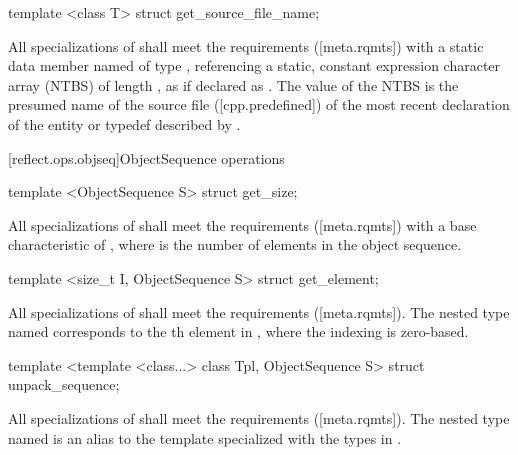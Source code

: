 \begin{std.txt}
\begin{itemdescr}
\end{itemdescr}

\begin{itemdecl}
template <class T> struct get_source_file_name;
\end{itemdecl}

\begin{itemdescr}
\pnum
All specializations of  shall meet the  requirements ([meta.rqmts]) with a static data member named  of type , referencing a static, constant expression character array (NTBS) of length , as if declared as . The value of the NTBS is the presumed name of the source file ([cpp.predefined]) of the most recent declaration of the entity or typedef described by .

\end{itemdescr}

\end{std.txt}

[reflect.ops.objseq]{ObjectSequence operations}

\begin{std.txt}\color{addclr}

\begin{itemdecl}
template <ObjectSequence S> struct get_size;
\end{itemdecl}

\begin{itemdescr}
\pnum
All specializations of  shall meet the  requirements ([meta.rqmts]) with a base characteristic of , where  is the number of elements in the object sequence.
\end{itemdescr}

\begin{itemdecl}
template <size_t I, ObjectSequence S> struct get_element;
\end{itemdecl}

\begin{itemdescr}
\pnum
\remarks
All specializations of  shall meet the  requirements ([meta.rqmts]). The nested type named  corresponds to the th element  in , where the indexing is zero-based.
\end{itemdescr}

\begin{itemdecl}
template <template <class...> class Tpl, ObjectSequence S>
  struct unpack_sequence;
\end{itemdecl}

\begin{itemdescr}
\pnum
\remarks
All specializations of  shall meet the  requirements ([meta.rqmts]). The nested type named  is an alias to the template  specialized with the types in .
\end{itemdescr}
\end{std.txt}

